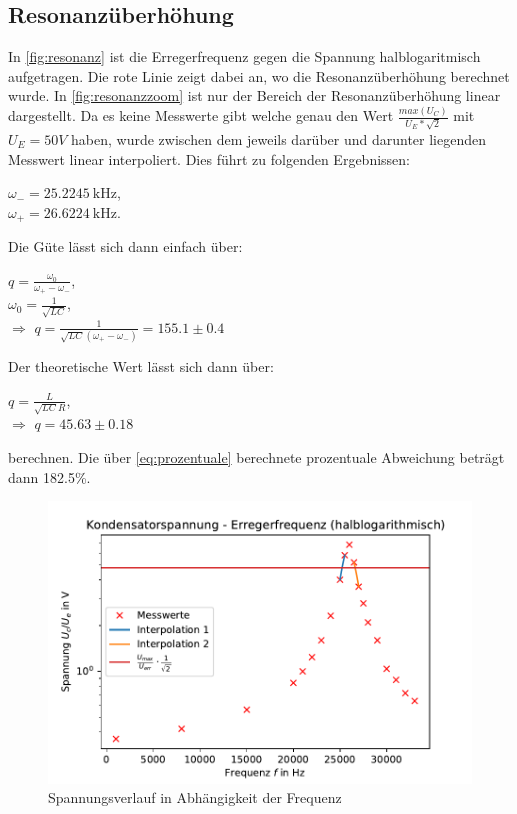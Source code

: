 \documentclass[
  bibliography=totoc,     %
  captions=tableheading,  %
  titlepage=firstiscover, %
]{scrartcl}
\begin{document}
    \subsection{Resonanzüberhöhung}
    \label{sec:res}
    In \autoref{fig:resonanz} ist die Erregerfrequenz gegen die Spannung halblogaritmisch aufgetragen.
    Die rote Linie zeigt dabei an, wo die Resonanzüberhöhung berechnet wurde. In
    \autoref{fig:resonanzzoom} ist nur der Bereich der Resonanzüberhöhung linear dargestellt. Da es keine
    Messwerte gibt welche genau den Wert $\frac{max(U_C)}{U_E*\sqrt{2}}$ mit $U_E=50V$ haben, wurde zwischen
    dem jeweils darüber und darunter liegenden Messwert linear interpoliert. Dies führt zu folgenden Ergebnissen:
    \begin{center}
        $\omega_-=\SI[]{25.2245}[]{\kilo\hertz}$,\\
        $\omega_+=\SI[]{26.6224}[]{\kilo\hertz}$.\\
    \end{center}
    Die Güte lässt sich dann einfach über:
    \begin{center}
        $q=\frac{\omega_0}{\omega_+-\omega_-}$,\\
        $\omega_0=\frac{1}{\sqrt{LC}}$,\\
        $\Rightarrow$ $q=\frac{1}{\sqrt{LC}(\omega_+-\omega_-)} =155.1 \pm 0.4$
    \end{center} 

    Der theoretische Wert lässt sich dann über:
    \begin{center}
        $q=\frac{L}{\sqrt{LC}R}$,\\
        $\Rightarrow$  $q= 45.63\pm 0.18$\\
    \end{center}
    berechnen. Die über \autoref{eq:prozentuale} berechnete prozentuale Abweichung beträgt dann 182.5\%.
    \begin{figure}
      \centering
      \includegraphics{frequenz.pdf}
      \caption{Spannungsverlauf in Abhängigkeit der Frequenz}
      \label{fig:resonanz}
    \end{figure}
\end{document}
